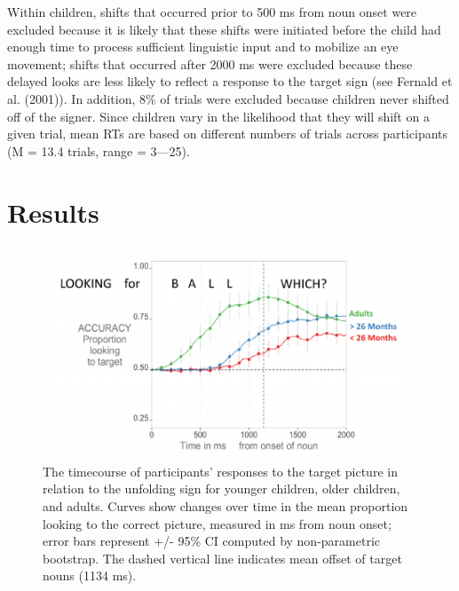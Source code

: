 \documentclass[12pt,]{article}
\begin{document}
Within children, shifts that occurred prior to 500 ms from noun onset
were excluded because it is likely that these shifts were initiated
before the child had enough time to process sufficient linguistic input
and to mobilize an eye movement; shifts that occurred after 2000 ms were
excluded because these delayed looks are less likely to reflect a
response to the target sign (see Fernald et al. (2001)). In addition,
8\% of trials were excluded because children never shifted off of the
signer. Since children vary in the likelihood that they will shift on a
given trial, mean RTs are based on different numbers of trials across
participants (M = 13.4 trials, range = 3---25).

\section{Results}\label{results}

\begin{figure}[htbp]
\centering
\includegraphics{Figs/profile plot png-1.pdf}
\caption{The timecourse of participants' responses to the target picture
in relation to the unfolding sign for younger children, older children,
and adults. Curves show changes over time in the mean proportion looking
to the correct picture, measured in ms from noun onset; error bars
represent +/- 95\% CI computed by non-parametric bootstrap. The dashed
vertical line indicates mean offset of target nouns (1134 ms).}
\end{figure}
\end{document}
